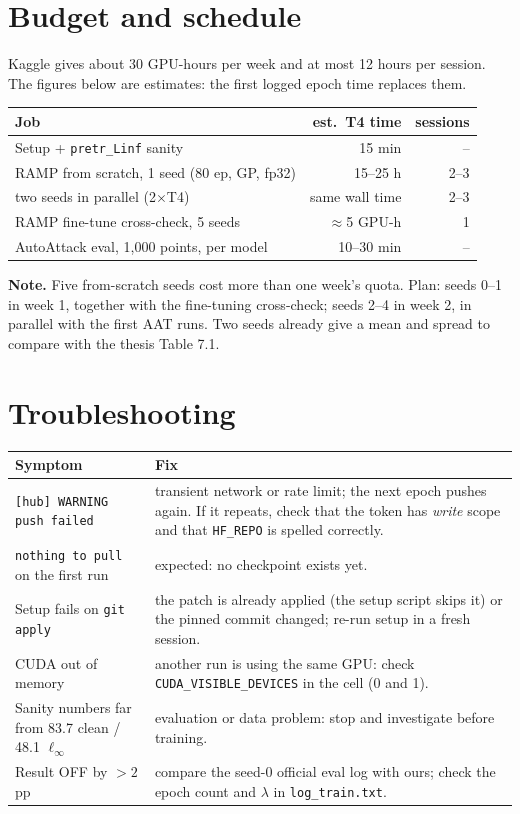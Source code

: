 \documentclass[11pt,a4paper]{article}
\newcommand{\code}[1]{\texttt{\small #1}}
\newcommand{\note}[1]{\par\smallskip\noindent\textcolor{warn}{\textbf{Note.}} #1\par\smallskip}
\begin{document}
\section{Budget and schedule}
Kaggle gives about 30 GPU-hours per week and at most 12 hours per session. The figures below are
estimates: the first logged epoch time replaces them.

\begin{table}[h]
\centering\small
\begin{tabular}{@{}lrr@{}}
\toprule
Job & est.\ T4 time & sessions \\
\midrule
Setup + \code{pretr\_Linf} sanity & 15 min & -- \\
RAMP from scratch, 1 seed (80 ep, GP, fp32) & 15--25 h & 2--3 \\
two seeds in parallel (2$\times$T4) & same wall time & 2--3 \\
RAMP fine-tune cross-check, 5 seeds & $\approx$5 GPU-h & 1 \\
AutoAttack eval, 1{,}000 points, per model & 10--30 min & -- \\
\bottomrule
\end{tabular}
\end{table}
\note{Five from-scratch seeds cost more than one week's quota. Plan: seeds 0--1 in week 1, together with
the fine-tuning cross-check; seeds 2--4 in week 2, in parallel with the first AAT runs. Two seeds
already give a mean and spread to compare with the thesis Table 7.1.}

\section{Troubleshooting}
\begin{table}[h]
\centering\small
\begin{tabularx}{\linewidth}{@{}lX@{}}
\toprule
Symptom & Fix \\
\midrule
\code{[hub] WARNING push failed} & transient network or rate limit; the next epoch pushes again. If it repeats, check that the token has \emph{write} scope and that \code{HF\_REPO} is spelled correctly. \\
\code{nothing to pull} on the first run & expected: no checkpoint exists yet. \\
Setup fails on \code{git apply} & the patch is already applied (the setup script skips it) or the pinned commit changed; re-run setup in a fresh session. \\
CUDA out of memory & another run is using the same GPU: check \code{CUDA\_VISIBLE\_DEVICES} in the cell (0 and 1). \\
Sanity numbers far from 83.7 clean / 48.1 $\ell_\infty$ & evaluation or data problem: stop and investigate before training. \\
Result OFF by $>2$\,pp & compare the seed-0 official eval log with ours; check the epoch count and $\lambda$ in \code{log\_train.txt}. \\
\bottomrule
\end{tabularx}
\end{table}
\end{document}
